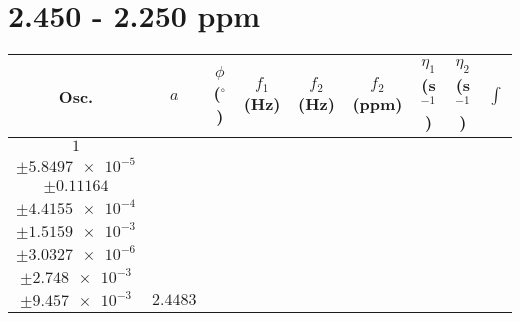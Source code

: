 \documentclass[8pt]{article}
\begin{document}
\section*{2.450 - 2.250 ppm}
\begin{longtable}[l]{c c c c c c c c c}
\toprule
Osc. & $a$ & $\phi$ ($^{\circ}$) & $f_1$ (Hz) & $f_2$ (Hz) & $f_2$ (ppm) & $\eta_1$ (s$^{-1}$) & $\eta_2$ (s$^{-1}$) & $\int$\\
\midrule
$\num{1}$ & \begin{tabular}[c]{@{}c@{}}$\num{3.0288e-2}$ \\ $\pm\num{5.8497e-5}$\end{tabular} & \begin{tabular}[c]{@{}c@{}}$\num{-0.88376}$ \\ $\pm\num{0.11164}$\end{tabular} & \begin{tabular}[c]{@{}c@{}}$\num{-11.395}$ \\ $\pm\num{4.4155e-4}$\end{tabular} & \begin{tabular}[c]{@{}c@{}}$\num{1.1685e+3}$ \\ $\pm\num{1.5159e-3}$\end{tabular} & \begin{tabular}[c]{@{}c@{}}$\num{2.3376}$ \\ $\pm\num{3.0327e-6}$\end{tabular} & \begin{tabular}[c]{@{}c@{}}$\num{1.1691}$ \\ $\pm\num{2.748e-3}$\end{tabular} & \begin{tabular}[c]{@{}c@{}}$\num{4.216}$ \\ $\pm\num{9.457e-3}$\end{tabular} & $\num{2.4483}$\\

\end{longtable}
\end{document}
